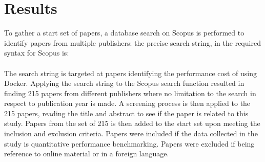 \section{Results}
To gather a start set of papers, a database search on Scopus \cite{scopus} is performed to identify papers from multiple publishers: the precise search string, in the required syntax for Scopus is: \\

{}\\

The search string is targeted at papers identifying the performance cost of using Docker. Applying the search string to the Scopus search function resulted in finding 215 papers from different publishers where no limitation to the search in respect to publication year is made. A screening process is then applied to the 215 papers, reading the title and abstract to see if the paper is related to this study. Papers from the set of 215 is then added to the start set upon meeting the inclusion and exclusion criteria. Papers were included if the data collected in the study is quantitative performance benchmarking. Papers were excluded if being reference to online material or in a foreign language.\\

